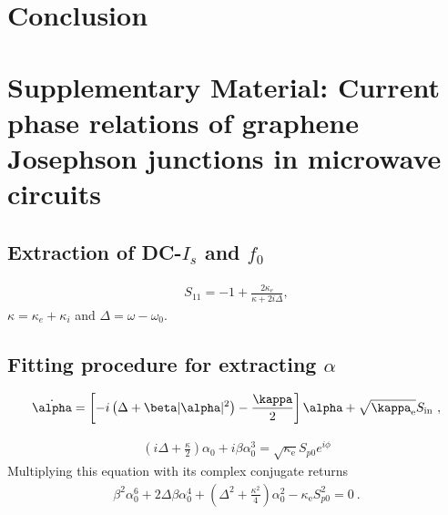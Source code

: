 \section{Conclusion}


\pagebreak
\clearpage



\section{Supplementary Material: Current phase relations of graphene Josephson junctions in microwave circuits}

\subsection{Extraction of DC-$I_s$ and $f_0$}

\begin{align}
S_{11} = -1+\frac{2\kappa_e}{\kappa+2i\Delta},
\end{align}
$\kappa=\kappa_e+\kappa_i$ and $\Delta=\omega-\omega_0$.

\subsection{Fitting procedure for extracting $\alpha$}

\begin{align}
\dot{\alpha} = \left[ -i \left( \Delta+\beta\abs{\alpha}^2 \right)-\frac{\kappa}{2} \right]\alpha + \sqrt{\kappa_\text{e}} S_\text{in}\ ,
\label{eq:Duffing-EOM}
\end{align}

\begin{align}
\left(i\Delta+\frac{\kappa}{2}\right)\alpha_0 + i\beta\alpha_0^3=\sqrt{\kappa_\text{e}}S_{p0}e^{i\phi}
\end{align}
% 
Multiplying this equation with its complex conjugate returns
% 
\begin{align}
\beta^2 \alpha_0^6 + 2\Delta\beta\alpha_0^4 + \left(\Delta^2+\frac{\kappa^2}{4}\right)\alpha_0^2 - \kappa_\text{e} S_{p0}^2 = 0\ .
\label{eq:polynom}
\end{align}

